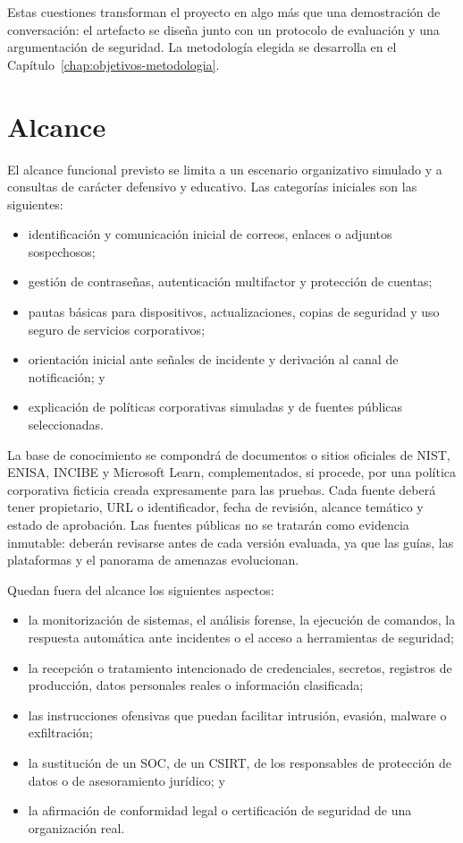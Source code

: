Estas cuestiones transforman el proyecto en algo más que una demostración de
conversación: el artefacto se diseña junto con un protocolo de evaluación y una
argumentación de seguridad. La metodología elegida se desarrolla en el
Capítulo~\ref{chap:objetivos-metodologia}.

\section{Alcance}
\label{sec:alcance}

El alcance funcional previsto se limita a un escenario organizativo simulado y
a consultas de carácter defensivo y educativo. Las categorías iniciales son las
siguientes:

\begin{itemize}
  \item identificación y comunicación inicial de correos, enlaces o adjuntos
  sospechosos;
  \item gestión de contraseñas, autenticación multifactor y protección de
  cuentas;
  \item pautas básicas para dispositivos, actualizaciones, copias de seguridad y
  uso seguro de servicios corporativos;
  \item orientación inicial ante señales de incidente y derivación al canal de
  notificación; y
  \item explicación de políticas corporativas simuladas y de fuentes públicas
  seleccionadas.
\end{itemize}

La base de conocimiento se compondrá de documentos o sitios oficiales de NIST,
ENISA, INCIBE y Microsoft Learn, complementados, si procede, por una política
corporativa ficticia creada expresamente para las pruebas. Cada fuente deberá
tener propietario, URL o identificador, fecha de revisión, alcance temático y
estado de aprobación. Las fuentes públicas no se tratarán como evidencia
inmutable: deberán revisarse antes de cada versión evaluada, ya que las guías,
las plataformas y el panorama de amenazas evolucionan.

Quedan fuera del alcance los siguientes aspectos:

\begin{itemize}
  \item la monitorización de sistemas, el análisis forense, la ejecución de
  comandos, la respuesta automática ante incidentes o el acceso a herramientas
  de seguridad;
  \item la recepción o tratamiento intencionado de credenciales, secretos,
  registros de producción, datos personales reales o información clasificada;
  \item las instrucciones ofensivas que puedan facilitar intrusión, evasión,
  malware o exfiltración;
  \item la sustitución de un SOC, de un CSIRT, de los responsables de protección
  de datos o de asesoramiento jurídico; y
  \item la afirmación de conformidad legal o certificación de seguridad de una
  organización real.
\end{itemize}

